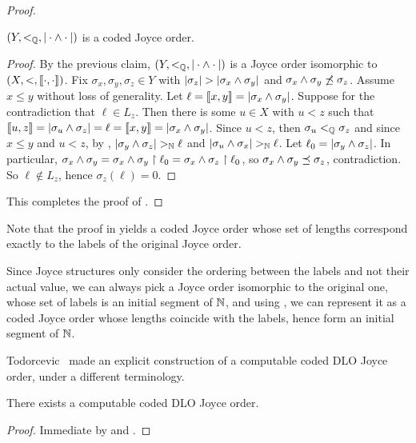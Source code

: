 \begin{proof}
\begin{claim}
$(Y, <_{\mathbb{Q}}, |\cdot \wedge \cdot|)$ is a coded Joyce order.
\end{claim}
\begin{proof}
By the previous claim, $(Y, <_{\mathbb{Q}}, |\cdot \wedge \cdot|)$ is a Joyce order isomorphic to $(X, <, \llbracket \cdot , \cdot \rrbracket)$.
Fix $\sigma_x, \sigma_y, \sigma_z \in Y$ with $|\sigma_z| > |\sigma_x \wedge \sigma_y|$ and $\sigma_x \wedge \sigma_y \not \preceq \sigma_z$. Assume $x \leq y$ without loss of generality.  Let $\ell = \llbracket x , y \rrbracket =  |\sigma_x \wedge \sigma_y|$. Suppose for the contradiction that $\ell \in L_z$. Then there is some $u \in X$ with $u < z$ such that $\llbracket u , z \rrbracket = |\sigma_u \wedge \sigma_z| = \ell = \llbracket x , y \rrbracket = |\sigma_x \wedge \sigma_y|$. 
Since $u < z$, then $\sigma_u <_{\mathbb{Q}} \sigma_z$ and since $x \leq y$ and $u < z$, 
by , $|\sigma_y \wedge \sigma_z|  >_{\mathbb{N}} \ell$ and $|\sigma_u \wedge \sigma_x| >_{\mathbb{N}} \ell$.
Let $\ell_0 = |\sigma_y \wedge \sigma_z|$. In particular, $\sigma_x \wedge \sigma_y = \sigma_x \wedge \sigma_y \upharpoonright \ell_0 = \sigma_x \wedge \sigma_z \upharpoonright \ell_0$, so $\sigma_x \wedge \sigma_y \preceq \sigma_z$, contradiction. So $\ell \not\in L_z$, hence $\sigma_z(\ell) = 0$. 
\end{proof}
This completes the proof of .
\end{proof}

Note that the proof in  yields a coded Joyce order whose set of lengths correspond exactly to the labels of the original Joyce order.

\begin{remark}\label{remark:labels-initial-segment}
 Since Joyce structures only consider the ordering between the labels and not their actual value, we can always pick a Joyce order isomorphic to the original one, whose set of labels is an initial segment of $\mathbb{N}$, and using , we can represent it as a coded Joyce order whose lengths coincide with the labels, hence form an initial segment of $\mathbb{N}$.
\end{remark}

Todorcevic~\cite[Lemma 6.20]{Todorcevic2010Ramsey} made an explicit construction of a computable coded DLO Joyce order, under a different terminology.

\begin{corollary}\label{cor:true-dlo-joyce-order-exists}
There exists a computable coded DLO Joyce order.
\end{corollary}
\begin{proof}
Immediate by  and .
\end{proof}

